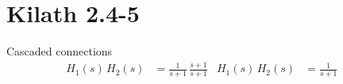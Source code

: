 \section{Kilath 2.4-5}
Cascaded connections
\begin{align*}
    H_1(s)\,H_2(s) &= \frac{1}{s+1}\,\frac{s+1}{s+1} & H_1(s)\,H_2(s) &= \frac{1}{s+1} & 
\end{align*}
